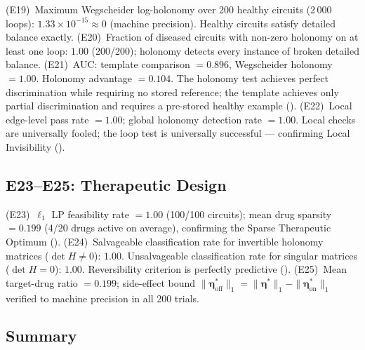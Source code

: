 \documentclass[twocolumn,11pt,a4paper]{article}
\newcommand{\drugvec}{\boldsymbol{\eta}}
\begin{document}
(E19)~Maximum Wegscheider log-holonomy over 200 healthy circuits
(2\,000 loops): $1.33 \times 10^{-15} \approx 0$ (machine precision).
Healthy circuits satisfy detailed balance exactly.
(E20)~Fraction of diseased circuits with non-zero holonomy on at least
one loop: $1.00$ (200/200); holonomy detects every instance of broken
detailed balance.
(E21)~AUC: template comparison $= 0.896$, Wegscheider holonomy $= 1.00$.
Holonomy advantage $= 0.104$.
The holonomy test achieves perfect discrimination while requiring no
stored reference; the template achieves only partial discrimination and
requires a pre-stored healthy example ().
(E22)~Local edge-level pass rate $= 1.00$; global holonomy detection rate
$= 1.00$.
Local checks are universally fooled; the loop test is universally successful
--- confirming Local Invisibility ().

\subsection{E23--E25: Therapeutic Design}

(E23)~$\ell_1$ LP feasibility rate $= 1.00$ (100/100 circuits);
mean drug sparsity $= 0.199$ (4/20 drugs active on average),
confirming the Sparse Therapeutic Optimum ().
(E24)~Salvageable classification rate for invertible holonomy matrices
($\det H \neq 0$): $1.00$.
Unsalvageable classification rate for singular matrices ($\det H = 0$):
$1.00$.
Reversibility criterion is perfectly predictive ().
(E25)~Mean target-drug ratio $= 0.199$; side-effect bound
$\|\drugvec^*_{\mathrm{off}}\|_1 = \|\drugvec^*\|_1 - \|\drugvec^*_{\mathrm{on}}\|_1$
verified to machine precision in all 200 trials.

\subsection{Summary}
\end{document}
